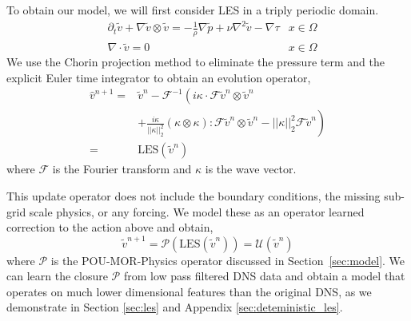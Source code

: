 To obtain our model, we will first consider LES in a triply periodic domain.
\begin{equation}\label{eq:les_periodic}
\begin{aligned}
    &\partial_t \tilde{v} + \nabla \tilde{v} \otimes \tilde{v} = -\frac{1}{\rho} \nabla \tilde{p} + \nu \nabla^2 \tilde{v} - \nabla \tau  & x \in \Omega \\
    &\nabla \cdot \tilde{v} = 0  & x \in \Omega 
    \end{aligned}
\end{equation}
We use the Chorin projection method to eliminate the pressure term and the explicit Euler time integrator to obtain an evolution operator,
\begin{equation}
\begin{aligned}
\hat{v}^{n+1} = &\tilde{v}^n  - \mathcal{F}^{-1} \left(i {\kappa} \cdot \mathcal{F}{\tilde{v}^n \otimes \tilde{v}^n} \right. \\
&\left. + \frac{i {\kappa}}{||{\kappa}||_2^2} ({\kappa} \otimes {\kappa}) : \mathcal{F}\tilde{v}^n \otimes \tilde{v}^n  - ||{\kappa}||_2^2 \mathcal{F}\tilde{{v}}^n \right)\\
= &\mathrm{LES}(\tilde{v}^n)
\end{aligned}
\end{equation}
where $\mathcal{F}$ is the Fourier transform and $\kappa$ is the wave vector.
 
This update operator does not include the boundary conditions, the missing sub-grid scale physics, or any forcing. We model these as an operator learned correction to the action above and obtain,
\begin{equation}
\tilde{v}^{n+1} = \mathcal{P} ( \mathrm{LES}(\tilde{v}^n)) = \mathcal{U}(\tilde{v}^n)
\end{equation}
where $\mathcal{P}$ is the POU-MOR-Physics operator discussed in Section~\ref{sec:model}. We can learn the closure $\mathcal{P}$ from low pass filtered DNS data and obtain a model that operates on much lower dimensional features than the original DNS, as we demonstrate in Section \ref{sec:les} and Appendix \ref{sec:deteministic_les}.

